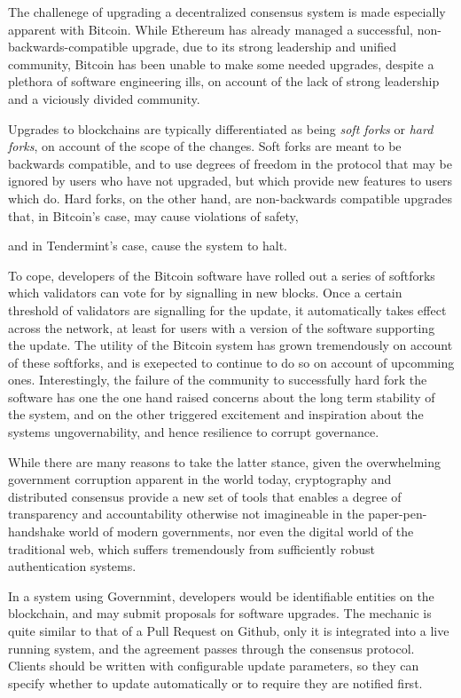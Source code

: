 The challenege of upgrading a decentralized consensus system is made especially apparent with Bitcoin.
While Ethereum has already managed a successful, non-backwards-compatible upgrade, 
due to its strong leadership and unified community,
Bitcoin has been unable to make some needed upgrades,
despite a plethora of software engineering ills,
on account of the lack of strong leadership and a viciously divided community.

Upgrades to blockchains are typically differentiated as being \emph{soft forks} or \emph{hard forks},
on account of the scope of the changes.
Soft forks are meant to be backwards compatible, and to use degrees of freedom in the protocol that may be ignored
by users who have not upgraded, but which provide new features to users which do.
Hard forks, on the other hand, are non-backwards compatible upgrades that,
in Bitcoin's case, may cause violations of safety, 

and in Tendermint's case, cause the system to halt.

To cope, developers of the Bitcoin software have rolled out a series of softforks which validators can vote for
by signalling in new blocks. 
Once a certain threshold of validators are signalling for the update,
it automatically takes effect across the network, at least for users with a version of the software supporting the update.
The utility of the Bitcoin system has grown tremendously on account of these softforks, 
and is exepected to continue to do so on account of upcomming ones.
Interestingly, the failure of the community to successfully hard fork the software has
one the one hand raised concerns about the long term stability of the system,
and on the other triggered excitement and inspiration about the systems ungovernability,
and hence resilience to corrupt governance.

While there are many reasons to take the latter stance, 
given the overwhelming government corruption apparent in the world today,
cryptography and distributed consensus provide a new set of tools that enables a degree
of transparency and accountability otherwise not imagineable in the paper-pen-handshake world of modern governments,
nor even the digital world of the traditional web, which suffers tremendously from sufficiently robust authentication systems.

In a system using Governmint, developers would be identifiable entities on the blockchain,
and may submit proposals for software upgrades. 
The mechanic is quite similar to that of a Pull Request on Github, 
only it is integrated into a live running system,
and the agreement passes through the consensus protocol.
Clients should be written with configurable update parameters, 
so they can specify whether to update automatically or to require they are notified first.

